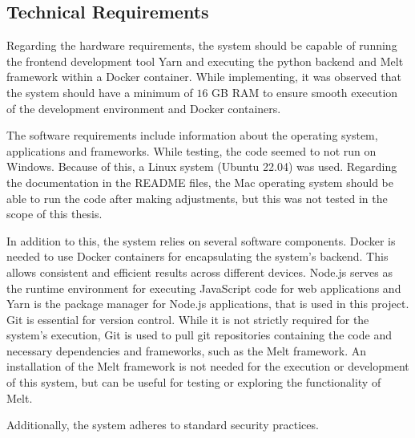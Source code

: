 \documentclass[../MasterThesis.tex]{subfiles}
\begin{document}
\subsection{Technical Requirements} \label{subsection:technicalrequirements}



Regarding the hardware requirements, the system should be capable of running the frontend development tool Yarn and executing the python backend and Melt framework within a Docker container.
While implementing, it was observed that the system should have a minimum of $16$ GB RAM to ensure smooth execution of the development environment and Docker containers.



The software requirements include information about the operating system, applications and frameworks.
While testing, the code seemed to not run on Windows. Because of this, a Linux system (Ubuntu 22.04) was used. Regarding the documentation in the README files, the Mac operating system should be able to run the code after making adjustments, but this was not tested in the scope of this thesis.


In addition to this, the system relies on several software components.
Docker is needed to use Docker containers for encapsulating the system's backend. This allows consistent and efficient results across different devices.
Node.js serves as the runtime environment for executing JavaScript code for web applications and Yarn is the package manager for Node.js applications, that is used in this project.
Git is essential for version control. While it is not strictly required for the system's execution, Git is used to pull git repositories containing the code and necessary dependencies and frameworks, such as the Melt framework. 
An installation of the Melt framework is not needed for the execution or development of this system, but can be useful for testing or exploring the functionality of Melt.

Additionally, the system adheres to standard security practices.


	
	
	
	
	
	
\end{document}

